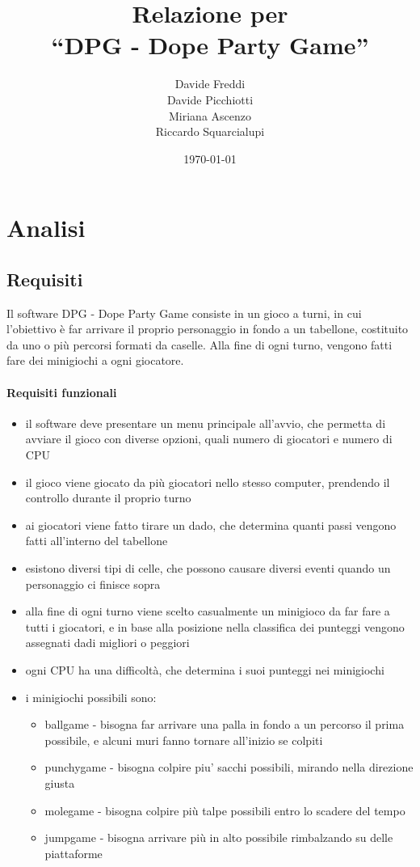 \documentclass[a4paper,12pt]{report}
\title{Relazione per\\``DPG - Dope Party Game''}
\author{Davide Freddi\\Davide Picchiotti\\Miriana Ascenzo\\Riccardo Squarcialupi}
\date{\today}
\begin{document}
	\maketitle

	\tableofcontents

	\chapter{Analisi}
	\section{Requisiti}
	Il software DPG - Dope Party Game consiste in un gioco a turni, in cui l'obiettivo è far arrivare il proprio personaggio in fondo a un tabellone, costituito da uno o più percorsi formati da caselle.
	Alla fine di ogni turno, vengono fatti fare dei minigiochi a ogni giocatore.

	\subsubsection{Requisiti funzionali}
	\begin{itemize}
		\item il software deve presentare un menu principale all'avvio, che permetta di avviare il gioco con diverse opzioni, quali numero di giocatori e numero di CPU
		\item il gioco viene giocato da più giocatori nello stesso computer, prendendo il controllo durante il proprio turno
		\item ai giocatori viene fatto tirare un dado, che determina quanti passi vengono fatti all'interno del tabellone
		\item esistono diversi tipi di celle, che possono causare diversi eventi quando un personaggio ci finisce sopra
		\item alla fine di ogni turno viene scelto casualmente un minigioco da far fare a tutti i giocatori, e in base alla posizione nella classifica dei punteggi vengono assegnati dadi migliori o peggiori
		\item ogni CPU ha una difficoltà, che determina i suoi punteggi nei minigiochi
		\item i minigiochi possibili sono:
		\begin{itemize}
			\item ballgame - bisogna far arrivare una palla in fondo a un percorso il prima possibile, e alcuni muri fanno tornare all'inizio se colpiti
			\item punchygame - bisogna colpire piu' sacchi possibili, mirando nella direzione giusta
			\item molegame - bisogna colpire più talpe possibili entro lo scadere del tempo
			\item jumpgame - bisogna arrivare più in alto possibile rimbalzando su delle piattaforme
		\end{itemize}
	\end{itemize}
\end{document}
